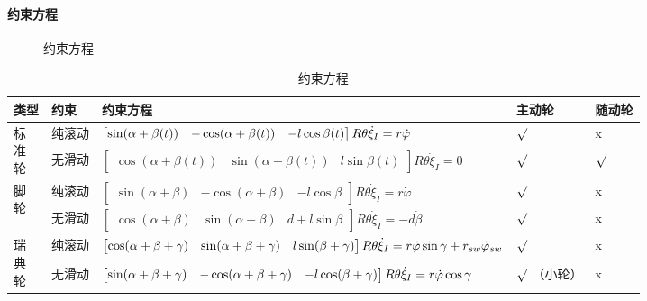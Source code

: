 \documentclass[
12pt, %
a4paper, 
oneside, %
headinclude,footinclude, %
]{scrartcl}
\begin{document}
\paragraph{约束方程}
\begin{figure}[H]
\centering
{} \quad
{} \quad
{}
\caption[约束方程]{约束方程}
\end{figure}

\begin{table}[H]
\centering
\caption{约束方程}
\begin{tabular}{|p{0.9cm}|p{1.3cm}|p{10cm}|p{1.4cm}|p{1.3cm}|}
\hline
类型 & 约束 & 约束方程 & 主动轮 & 随动轮 \\
\hline
\multirow{2}{*}{\parbox[c]{0.9cm}{标\\准\\轮}} & 纯滚动 & $ \begin{bmatrix} \sin(\alpha + \beta(t)) & -\cos(\alpha + \beta(t)) & -l\cos\beta(t) \end{bmatrix} R\theta \dot{\xi}_I \newline = r\dot{\varphi} $ & $ \surd $ & x \\
\cline{2-5}
 & 无滑动 & $ \begin{bmatrix} \cos(\alpha + \beta(t)) & \sin(\alpha + \beta(t)) & l\sin\beta(t) \end{bmatrix} R\theta \dot{\xi}_I = 0 $ & $ \surd $ & $ \surd $ \\
\hline
\multirow{2}{*}{\parbox[c]{0.9cm}{脚\\轮}} & 纯滚动 & $ \begin{bmatrix} \sin(\alpha + \beta) & -\cos(\alpha + \beta) & -l\cos\beta \end{bmatrix} R\theta \dot{\xi}_I = r\dot{\varphi} $ & $ \surd $ & x \\
\cline{2-5}
 & 无滑动 & $ \begin{bmatrix} \cos(\alpha + \beta) & \sin(\alpha + \beta) & d + l\sin\beta \end{bmatrix} R\theta \dot{\xi}_I = -d\dot{\beta} $ & $ \surd $ & x \\
\hline
\multirow{2}{*}{\parbox[c]{0.9cm}{瑞\\典\\轮}} & 纯滚动 & $ \begin{bmatrix} \cos(\alpha + \beta + \gamma) & \sin(\alpha + \beta + \gamma) & l\sin(\beta + \gamma) \end{bmatrix} R\theta \dot{\xi}_I \newline = r\dot{\varphi}\sin\gamma + r_{sw}\dot{\varphi}_{sw} $ & $ \surd $ & x \\
\cline{2-5}
 & 无滑动 & $ \begin{bmatrix} \sin(\alpha + \beta + \gamma) & -\cos(\alpha + \beta + \gamma) & -l\cos(\beta + \gamma) \end{bmatrix} R\theta \dot{\xi}_I \newline = r\dot{\varphi}\cos\gamma $ & $ \surd $ \newline（小轮） & x \\
\hline
\end{tabular}
\end{table}
\end{document}
